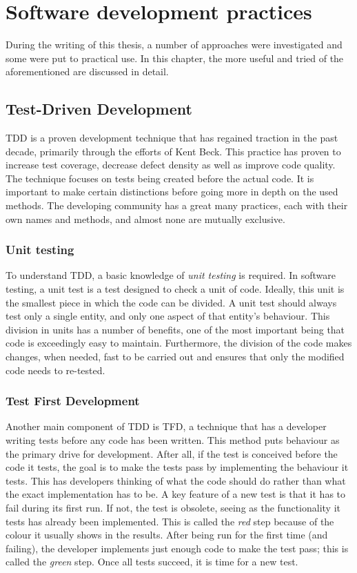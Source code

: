 \documentclass[11pt,british]{article}
\begin{document}
\newpage{}
\section{Software development practices}
During the writing of this thesis, a number of approaches were investigated and some were put to practical use. In this chapter, the more useful and tried of the aforementioned are discussed in detail.


\subsection{Test-Driven Development}
\label{subsec:TDD}
\gls{TDD} is a proven development technique that has regained traction in the past decade, primarily through the efforts of Kent Beck.\cite{VHDLUnit,agiletdd} This practice has proven to increase test coverage, decrease defect density as well as improve code quality.\cite{TDDinpractice,Siniaalto,BhatN06} The technique focuses on tests being created before the actual code. It is important to make certain distinctions before going more in depth on the used methods. The developing community has a great many practices, each with their own names and methods, and almost none are mutually exclusive.

\subsubsection{Unit testing}
To understand \gls{TDD}, a basic knowledge of \emph{unit testing} is required. In software testing, a unit test is a test designed to check a unit of code.\cite{extremeunit,VHDLUnit} Ideally, this unit is the smallest piece in which the code can be divided. A unit test should always test only a single entity, and only one aspect of that entity's behaviour. This division in units has a number of benefits, one of the most important being that code is exceedingly easy to maintain. Furthermore, the division of the code makes changes, when needed, fast to be carried out and ensures that only the modified code needs to re-tested.

\subsubsection{Test First Development}
Another main component of \gls{TDD} is \gls{TFD}, a technique that has a developer writing tests before any code has been written.\cite{extremeunit} This method puts behaviour as the primary drive for development. After all, if the test is conceived before the code it tests, the goal is to make the tests pass by implementing the behaviour it tests. This has developers thinking of what the code should do rather than what the exact implementation has to be. A key feature of a new test is that it has to fail during its first run. If not, the test is obsolete, seeing as the functionality it tests has already been implemented. This is called the \emph{red} step because of the colour it usually shows in the results. After being run for the first time (and failing), the developer implements just enough code to make the test pass; this is called the \emph{green} step. Once all tests succeed, it is time for a new test.
\end{document}
